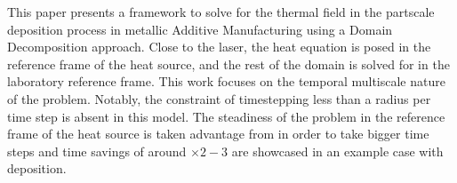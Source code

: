 This paper presents a framework to solve for
the thermal field in the partscale deposition
process in metallic Additive Manufacturing
using a Domain Decomposition approach.
Close to the laser, the heat equation is posed
in the reference
frame of the heat source,
and the rest of the domain is solved
for in the laboratory reference frame.
This work focuses on the temporal multiscale
nature of the problem. Notably, the constraint
of timestepping less than a radius per time step
is absent in this model. The steadiness
of the problem in the reference frame of the heat source
is taken advantage from in order to take bigger time steps
and time savings of around $\times 2-3$ are showcased
in an example case with deposition.
